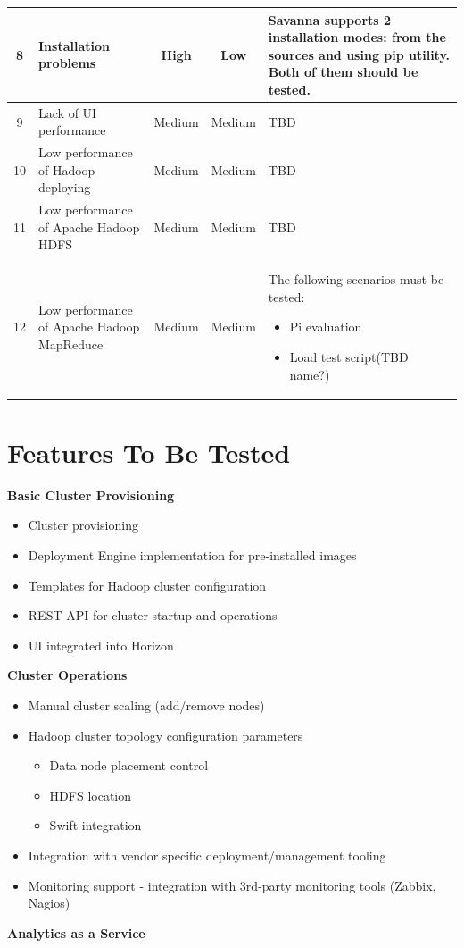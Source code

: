 \documentclass[a4paper,11pt]{article}
\begin{document}
\begin{longtable}{|c|p{3cm}|c|c|p{8cm}|}
8&Installation problems& High &  Low & Savanna supports 2 installation modes: from the sources and using pip utility. Both of them should be tested.\\ \hline
9&Lack of UI performance & Medium & Medium & TBD \\ \hline
10&Low performance of Hadoop deploying & Medium & Medium & TBD\\ \hline
11&Low performance of Apache Hadoop HDFS & Medium & Medium & TBD\\ \hline
12&Low performance of Apache Hadoop MapReduce & Medium & Medium & The following scenarios must be tested:
\begin{itemize}
\item Pi evaluation
\item Load test script(TBD name?)
\end{itemize}
\\ \hline
\end{longtable}





\section{Features To Be Tested}
\textbf{Basic Cluster Provisioning}

\begin{itemize}
    \item Cluster provisioning
    \item Deployment Engine implementation for pre-installed images
    \item Templates for Hadoop cluster configuration
    \item REST API for cluster startup and operations
    \item UI integrated into Horizon
\end{itemize}
\textbf{Cluster Operations}

\begin{itemize}
    \item Manual cluster scaling (add/remove nodes)
    \item Hadoop cluster topology configuration parameters
	\begin{itemize}
    		\item Data node placement control
        \item HDFS location
        \item Swift integration
    \end{itemize}

    \item Integration with vendor specific deployment/management tooling
    \item Monitoring support - integration with 3rd-party monitoring tools (Zabbix, Nagios)
\end{itemize}
\textbf{Analytics as a Service}
\end{document}
